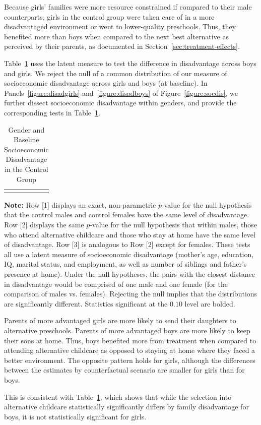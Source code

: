 Because girls' families were more resource constrained if compared to their male counterparts, girls in the control group were taken care of in a more disadvantaged environment or went to lower-quality preschools. Thus, they benefited more than boys when compared to the next best alternative as perceived by their parents, as documented in Section~\ref{sec:treatment-effects}.

Table~\ref{table:disadtests} uses the latent measure to test the difference in disadvantage across boys and girls. We reject the null of a common distribution of our measure of socioeconomic disadvantage across girls and boys (at baseline). In Panels~\ref{figure:disadgirls} and~\ref{figure:disadboys} of Figure~\ref{figure:socdis}, we further dissect socioeconomic disadvantage within genders, and provide the corresponding tests in Table~\ref{table:disadtests}.

\begin{table}[!htpb]
\begin{threeparttable}
\caption{Gender and Baseline Socioeconomic Disadvantage in the Control Group} \label{table:disadtests}
\centering
\begin{tabularx}{16.5cm}{XcX}
&  &
\end{tabularx}
\begin{tablenotes}
\footnotesize
\item \textbf{Note:} Row [1] displays an exact, non-parametric $p$-value for the null hypothesis that the control males and control females have the same level of disadvantage. Row [2] displays the same $p$-value for the null  hypothesis that within males, those who attend alternative childcare and those who stay at home have the same level of disadvantage. Row [3] is analogous to Row [2] except for females. These tests all use a latent measure of socioeconomic disadvantage (mother's age, education, IQ, marital status, and employment, as well as number of siblings and father's presence at home). Under the null hypotheses, the pairs with the closest distance in disadvantage would be comprised of one male and one female (for the comparison of males vs. females). Rejecting the null implies that the distributions are significantly different. Statistics significant at the $0.10$ level are bolded.
\end{tablenotes}
\end{threeparttable}
\end{table}

Parents of more advantaged girls are more likely to send their daughters to alternative preschools. Parents of more advantaged boys are more likely to keep their sons at home. Thus, boys benefited more from treatment when compared to attending alternative childcare as opposed to staying at home where they faced a better environment. The opposite pattern holds for girls, although the differences between the estimates by counterfactual scenario are smaller for girls than for boys. 

This is consistent with Table~\ref{table:disadtests}, which shows that while the selection into alternative childcare statistically significantly differs by family disadvantage for boys, it is not statistically significant for girls. 
